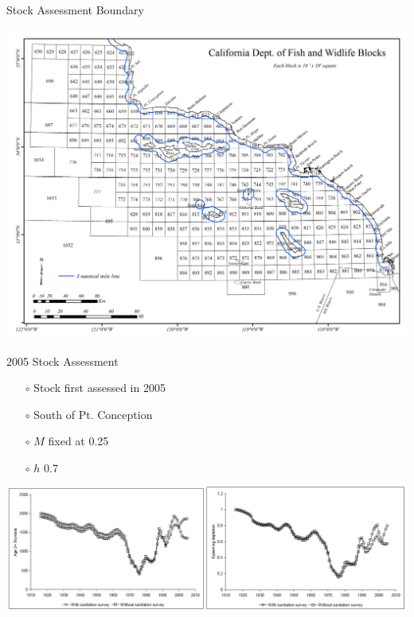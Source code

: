 \documentclass[ignorenonframetext,compress]{beamer}
\begin{document}
\begin{frame}{Stock Assessment Boundary}

\centering
\includegraphics{Figures/assess_region_map.png}

\end{frame}

\begin{frame}{2005 Stock Assessment}

\begin{itemize}
\item[$\circ$] Stock first assessed in 2005
\item[$\circ$] South of Pt. Conception
\item[$\circ$] $M$ fixed at 0.25
\item[$\circ$] $h$ 0.7
\end{itemize}

\includegraphics{Figures/2005_bio_depl.png}

\end{frame}
\end{document}
